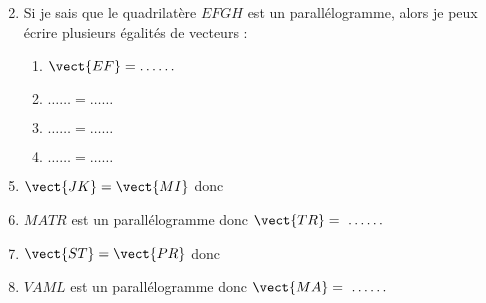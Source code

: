 \documentclass[a4paper]{article}
\begin{document}
\begin{multicols}{2}
  \begin{enumerate}
    \setcounter{enumi}{1}
    \item Si je sais que le quadrilatère $EFGH$ est un parallélogramme, alors je peux écrire plusieurs égalités de vecteurs :
      \vspace*{2mm}
      \begin{multicols}{2}
	\begin{enumerate}
	  \item[] $\vect{EF}=\hdots\hdots$
	    \smallskip
	  \item[] $\hdots\hdots=\hdots\hdots$
	    \smallskip
	  \item[] $\hdots\hdots=\hdots\hdots$
	  \item[] $\hdots\hdots=\hdots\hdots$
	\end{enumerate}
      \end{multicols}
  \end{enumerate}\columnbreak
  \vspace*{3cm}
\end{multicols}

\pagebreak

\begin{multicols}{2}
  \begin{enumerate}
    \setcounter{enumi}{4}
    \item $\vect{JK}=\vect{MI}$ donc \dotfill
      \vspace{3cm}
    \item $MATR$ est un parallélogramme donc $\vect{TR}=~\hdots\hdots$
      \vspace{3cm}
    \item $\vect{ST}=\vect{PR}$ donc \dotfill
      \vspace{3cm}
    \item $VAML$ est un parallélogramme donc $\vect{MA}=~\hdots\hdots$
      \vspace*{3cm}
  \end{enumerate} 
\end{multicols}

\bigskip
\end{document}
